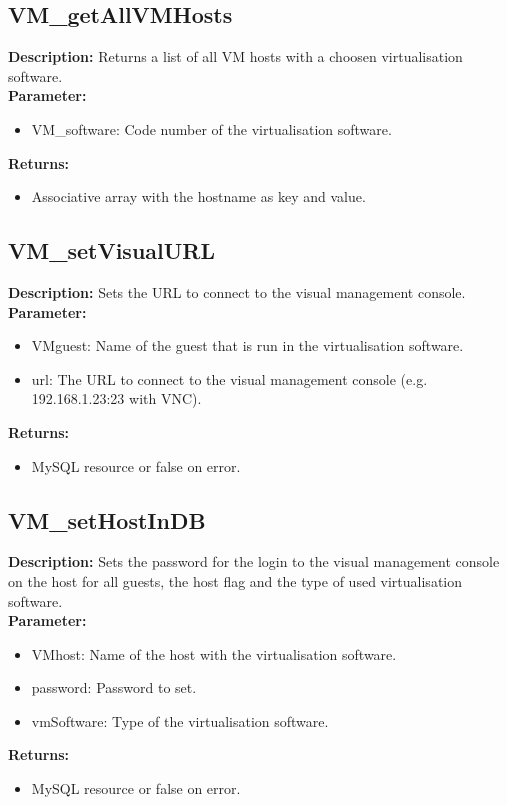 \subsection{VM\_getAllVMHosts}
\textbf{Description:} Returns a list of all VM hosts with a choosen virtualisation software.\\
\textbf{Parameter:}
\begin{itemize}
\item VM\_software: Code number of the virtualisation software.
\end{itemize}
\textbf{Returns:}
\begin{itemize}
\item Associative array with the hostname as key and value.
\end{itemize}

\subsection{VM\_setVisualURL}
\textbf{Description:} Sets the URL to connect to the visual management console.\\
\textbf{Parameter:}
\begin{itemize}
\item VMguest: Name of the guest that is run in the virtualisation software.
\item url: The URL to connect to the visual management console (e.g. 192.168.1.23:23 with VNC).
\end{itemize}
\textbf{Returns:}
\begin{itemize}
\item MySQL resource or false on error.
\end{itemize}

\subsection{VM\_setHostInDB}
\textbf{Description:} Sets the password for the login to the visual management console on the host for all guests, the host flag and the type of used virtualisation software.\\
\textbf{Parameter:}
\begin{itemize}
\item VMhost: Name of the host with the virtualisation software.
\item password: Password to set.
\item vmSoftware: Type of the virtualisation software.
\end{itemize}
\textbf{Returns:}
\begin{itemize}
\item MySQL resource or false on error.
\end{itemize}

